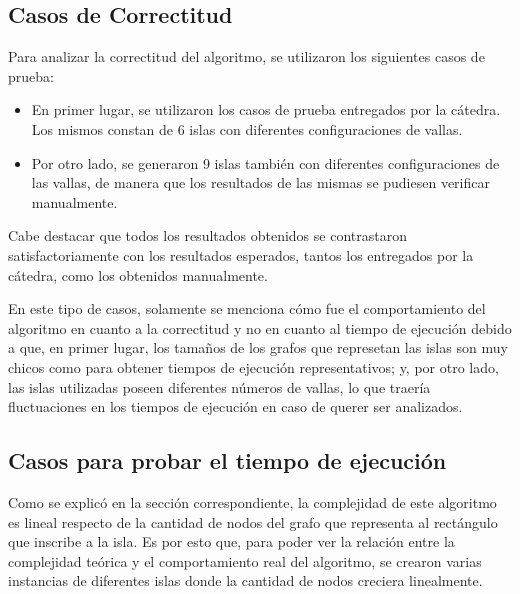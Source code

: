 \documentclass[a4paper, 12pt]{article}
\begin{document}
\subsection*{Casos de Correctitud}
Para analizar la correctitud del algoritmo, se utilizaron los siguientes casos de prueba:
\begin{itemize}
\item En primer lugar, se utilizaron los casos de prueba entregados por la cátedra. Los mismos constan de 6 islas con diferentes configuraciones de vallas.
\item Por otro lado, se generaron 9 islas también con diferentes configuraciones de las vallas, de manera que los resultados de las mismas se pudiesen verificar manualmente.
\end{itemize}

Cabe destacar que todos los resultados obtenidos se contrastaron satisfactoriamente con los resultados esperados, tantos los entregados por la cátedra, como los obtenidos manualmente.

En este tipo de casos, solamente se menciona cómo fue el comportamiento del algoritmo en cuanto a la correctitud y no en cuanto al tiempo de ejecución debido a que, en primer lugar, los tama\~{n}os de los grafos que represetan las islas son muy chicos como para obtener tiempos de ejecución representativos; y, por otro lado, las islas utilizadas poseen diferentes números de vallas, lo que traería fluctuaciones en los tiempos de ejecución en caso de querer ser analizados.

\subsection*{Casos para probar el tiempo de ejecución}
Como se explicó en la sección correspondiente, la complejidad de este algoritmo es lineal respecto de la cantidad de nodos del grafo que representa al rectángulo que inscribe a la isla. Es por esto que, para poder ver la relación entre la complejidad teórica y el comportamiento real del algoritmo, se crearon varias instancias de diferentes islas donde la cantidad de nodos creciera linealmente.
\end{document}
